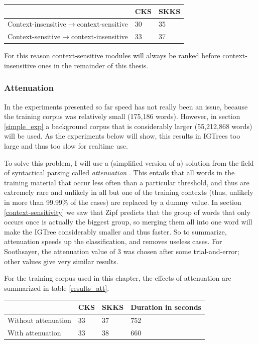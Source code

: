 \documentclass[12pt]{article}
\let\originaltable\table
\let\endoriginaltable\endtable
\renewenvironment{table}[1][ht]{%
  \originaltable[#1]
  \centering}%
  {\endoriginaltable}
\begin{document}
\begin{table}[h]
\begin{tabular}{l|ll} 
&CKS&SKKS\\
\hline
Context-insensitive$\rightarrow$context-sensitive&30&35\\
Context-sensitive$\rightarrow$context-insensitive&33&37\\
\end{tabular} 
\caption{Percentage of keystrokes Soothsayer saves with a context-sensitive module first and a context-insensitive module first} \label{results_concat}
\end{table}

For this reason context-sensitive modules will always be ranked before context-insensitive ones in the remainder of this thesis.

\subsubsection{Attenuation}

In the experiments presented so far speed has not really been an issue, because the training corpus was relatively small (175,186 words). However, in section \ref{simple_exp} a background corpus that is considerably larger (55,212,868 words) will be used. As the experiments below will show, this results in IGTrees too large and thus too slow for realtime use.

To solve this problem, I will use a (simplified version of a) solution from the field of syntactical parsing called \emph{attenuation} \cite{eisner96}. This entails that all words in the training material that occur less often than a particular threshold, and thus are extremely rare and unlikely in all but one of the training contexts (thus, unlikely in more than 99.99\% of the cases) are replaced by a dummy value. In section \ref{context-sensitivity} we saw that Zipf predicts that the group of words that only occurs once is actually the biggest group, so merging them all into one word will make the IGTree considerably smaller and thus faster. So to summarize, attenuation speeds up the classification, and removes useless cases. For Soothsayer, the attenuation value of 3 was chosen after some trial-and-error; other values give very similar results.

For the training corpus used in this chapter, the effects of attenuation are summarized in table \ref{results_att}.

\begin{table}[h]
\begin{tabular}{l|lll} 

&CKS&SKKS&Duration in seconds\\
\hline
Without attenuation&33&37&752\\
With attenuation&33&38&660\\
\end{tabular} 
\caption{Percentage of keystrokes saved and simulation times with and without attenuation.} \label{results_att}
\end{table}
\end{document}
